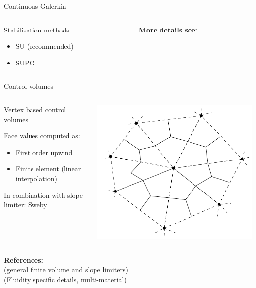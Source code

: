 \documentclass[12pt]{beamer}
\begin{document}
\begin{frame}{Continuous Galerkin}
  \begin{columns}
  \begin{column}{0.5\textwidth}
    \begin{block}{Stabilisation methods}
  \begin{itemize}
    \item SU (recommended)
    \item SUPG
  \end{itemize}
\end{block}
  \end{column}%
  \begin{column}{0.49\textwidth}
    {\bf More details see:}\\
    \citet{Donea2003}
  \end{column}
  \end{columns}
\end{frame}

\begin{frame}{Control volumes}
  \begin{columns}
  \begin{column}{0.5\textwidth}%
  Vertex based control volumes

  Face values computed as:
  \begin{itemize}
    \item First order upwind
    \item Finite element (linear interpolation)
  \end{itemize}
  In combination with slope limiter: Sweby
  \end{column}%
  \begin{column}{0.5\textwidth}%
    \hspace{-0.3\textwidth}
  \includegraphics[width=1.2\textwidth]{corner_unstructured_cv_tex}
  \end{column}%
  \end{columns}

  {\bf References:} \\
  \citet{Leveque2002} (general finite volume and slope limiters) \\
  \citet{Wilson2009} (Fluidity specific details, multi-material)
\end{frame}
\end{document}
